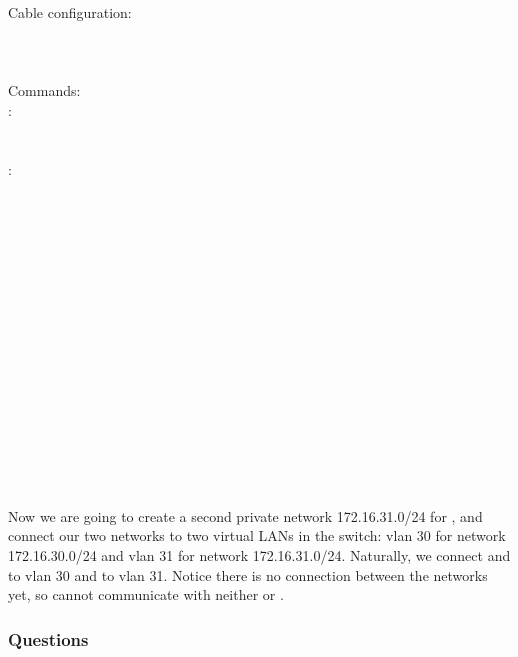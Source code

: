 \documentclass[compilation.tex]{subfiles}
\begin{document}
\begin{cables}{14}{0.3}
	Cable configuration:\\
	\\
	\\
	\\
	
	Commands:\\
	:\\
	\\
	\\
	:\\
	\\
	\\
	\\
	\\
	\\
	\\
	\\
	\\
	\\
	\\
	\\
	\\
	\\
	\\
	\\
	\\
\end{cables}

Now we are going to create a second private network 172.16.31.0/24 for , and connect our two networks to two virtual LANs in the switch: vlan 30 for network 172.16.30.0/24 and vlan 31 for network 172.16.31.0/24.
Naturally, we connect  and  to vlan 30 and  to vlan 31. Notice there is no connection between the networks yet, so  cannot communicate with neither  or .

\subsubsection{Questions}
\label{subsubsec:exp2questions}
\end{document}
